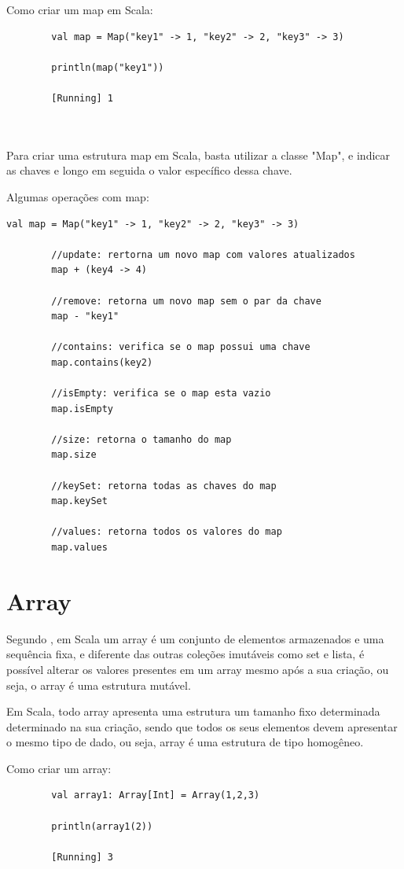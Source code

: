     Como criar um map em Scala:
    
    \begin{lstlisting}
    	val map = Map("key1" -> 1, "key2" -> 2, "key3" -> 3)
    	
    	println(map("key1"))
    	
    	[Running] 1
    	
    	
    \end{lstlisting}

	Para criar uma estrutura map em Scala, basta utilizar a classe "Map", e indicar as chaves e longo em seguida o valor específico dessa chave.
	
	Algumas operações com map:
	\begin{lstlisting}[breaklines]
		val map = Map("key1" -> 1, "key2" -> 2, "key3" -> 3)
		
		//update: rertorna um novo map com valores atualizados
		map + (key4 -> 4)
		
		//remove: retorna um novo map sem o par da chave
		map - "key1"
		
		//contains: verifica se o map possui uma chave
		map.contains(key2)
		
		//isEmpty: verifica se o map esta vazio
		map.isEmpty
		
		//size: retorna o tamanho do map
		map.size
		
		//keySet: retorna todas as chaves do map
		map.keySet
		
		//values: retorna todos os valores do map
		map.values
	\end{lstlisting}

	\section{Array}
	
	Segundo \cite{Odersky}, em Scala um array é um conjunto de elementos armazenados e uma sequência fixa, e diferente das outras coleções imutáveis como set e lista, é possível alterar os valores presentes em um array mesmo após a sua criação, ou seja, o array é uma estrutura mutável.
	
	Em Scala, todo array apresenta uma estrutura um tamanho fixo determinada determinado na sua criação, sendo que todos os seus elementos devem apresentar o mesmo tipo de dado, ou seja, array é uma estrutura de tipo homogêneo.
	
	Como criar um array:
	\begin{lstlisting}
		val array1: Array[Int] = Array(1,2,3)
		
		println(array1(2))
		
		[Running] 3
	\end{lstlisting}

